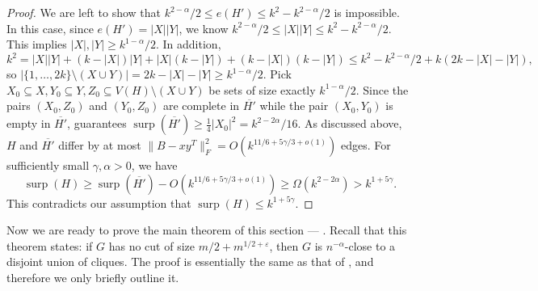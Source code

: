 \documentclass[11pt]{article}
\theoremstyle{plain}
\theoremstyle{definition}
\DeclareMathOperator{\surp}{surp}
\newcommand{\eps}{\varepsilon}
\begin{document}
\begin{proof}
We are left to show that $k^{2-\alpha}/2\le e(H')\leq k^2-k^{2-\alpha}/2$ is impossible.
In this case, since $e(H') = |X||Y|$, we know $k^{2-\alpha}/2\le |X||Y|\leq k^2-k^{2-\alpha}/2$.
This implies $|X|,|Y| \ge k^{1-\alpha}/2$.
In addition, $$
    k^2 = |X||Y| + (k-|X|)|Y| + |X|(k-|Y|) + (k-|X|)(k-|Y|) \le k^2-k^{2-\alpha}/2 + k(2k-|X|-|Y|),
$$
so $|\{1,\dots,2k\} \setminus (X\cup Y)|=2k-|X|-|Y| \ge k^{1-\alpha}/2$.
Pick $X_0\subseteq X, Y_0\subseteq Y, Z_0 \subseteq V(H) \setminus (X\cup Y)$ be sets of size exactly $k^{1-\alpha}/2$.
Since the pairs $(X_0, Z_0)$ and $(Y_0, Z_0)$ are complete in $\overline{H'}$ while the pair $(X_0, Y_0)$ is empty in $\overline{H'}$,  guarantees $\surp(\overline{H'})\geq \frac{1}{4}|X_0|^2=k^{2-2\alpha}/16$. 
As discussed above, $H$ and $\overline{H'}$ differ by at most $\|B-xy^T\|_F^2=O(k^{11/6+5\gamma/3+o(1)})$ edges.
For sufficiently small $\gamma,\alpha>0$, we have 
$$\surp(H)\geq \surp(\overline{H'})-O(k^{11/6+5\gamma/3+o(1)})\geq \Omega(k^{2-2\alpha})>k^{1+5\gamma}.$$
This contradicts our assumption that $\surp(H) \le k^{1+5\gamma}$.
\end{proof}

Now we are ready to prove the main theorem of this section --- . 
Recall that this theorem states: if $G$ has no cut of size $m/2+m^{1/2+\eps}$, then $G$ is $n^{-\alpha}$-close to a disjoint union of cliques. 
The proof is essentially the same as that of , and therefore we only briefly outline it.
\end{document}
